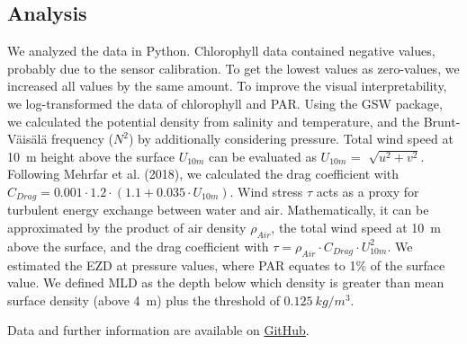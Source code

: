 \documentclass[../Main.tex]{subfiles}
\begin{document}
\subsection*{\crule[blue]{.2cm}{.2cm} Analysis}
We analyzed the data in Python.
Chlorophyll data contained negative values, probably due to the sensor calibration.
To get the lowest values as zero-values, we increased all values by the same amount.
To improve the visual interpretability, we log-transformed the data of chlorophyll and PAR.
Using the GSW package, we calculated the potential density from salinity and temperature, and the Brunt-Väisälä frequency ($N^2$) by additionally considering pressure.\supercite{gsw} 
Total wind speed at \SI{10}{m} height above the surface $U_{10m}$ can be evaluated as $U_{10m}$ = $\sqrt[]{u^2 + v^2}$. 
Following Mehrfar et al. (2018), we calculated the drag coefficient with $C_{Drag} = 0.001\cdot1.2\cdot  (1.1+0.035\cdot U_{10m})$. 
Wind stress $\tau$ acts as a proxy for turbulent energy exchange between water and air.
Mathematically, it can be approximated by the product of air density $\rho_{Air}$, the total wind speed at \SI{10}{m} above the surface, and the drag coefficient with $\tau = \rho_{Air}\cdot C_{Drag}\cdot U_{10m}^2$.\supercite{Mehrfar2018}
We estimated the EZD at pressure values, where PAR equates to 1\% of the surface value.\supercite{Lee2007}
We defined MLD as the depth below which density is greater than mean surface density (above \SI{4}{m}) plus the threshold of $\SI{0.125}{kg/m^3}$.

Data and further information are available on \href{https://github.com/joaldi2208/BloomDynamics}{GitHub}.
\end{document}
